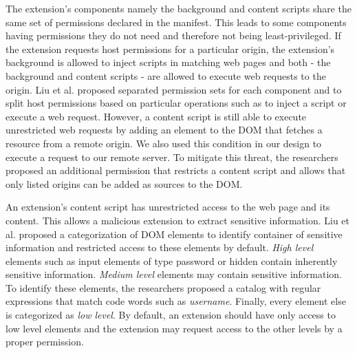 	The extension's components namely the background and content scripts share the same set of permissions declared in the manifest. This leads to some components having permissions they do not need and therefore not being least-privileged. If the extension requests host permissions for a particular origin, the extension's background is allowed to inject scripts in matching web pages and both - the background and content scripts - are allowed to execute web requests to the origin. Liu et al. proposed separated permission sets for each component and to split host permissions based on particular operations such as to inject a script or execute a web request. However, a content script is still able to execute unrestricted web requests by adding an element to the DOM that fetches a resource from a remote origin. We also used this condition in our design to execute a request to our remote server. To mitigate this threat, the researchers proposed an additional permission that restricts a content script and allows that only listed origins can be added as sources to the DOM.
	
	An extension's content script has unrestricted access to the web page and its content. This allows a malicious extension to extract sensitive information. Liu et al. proposed a categorization of DOM elements to identify container of sensitive information and restricted access to these elements by default. \textit{High level} elements such as input elements of type password or hidden contain inherently sensitive information. \textit{Medium level} elements may contain sensitive information. To identify these elements, the researchers proposed a catalog with regular expressions that match code words such as \textit{username}. Finally, every element else is categorized as \textit{low level}. By default, an extension should have only access to low level elements and the extension may request access to the other levels by a proper permission.